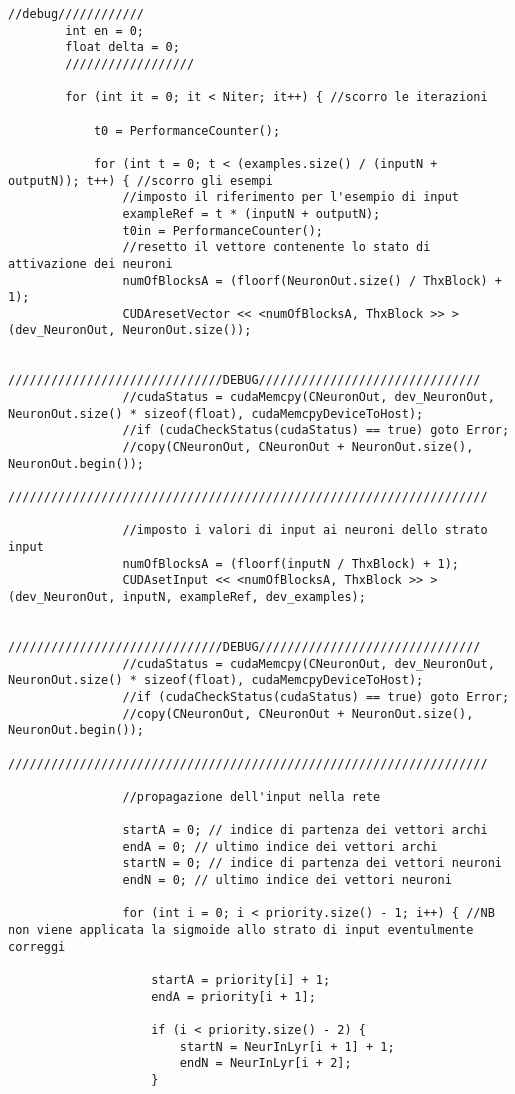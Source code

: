 \documentclass[10pt,a4paper]{article}
\begin{document}
\begin{lstlisting}[style=mycuda, caption=librerie usate, captionpos=b]
		//debug////////////
		int en = 0;
		float delta = 0;
		//////////////////

		for (int it = 0; it < Niter; it++) { //scorro le iterazioni

			t0 = PerformanceCounter();

			for (int t = 0; t < (examples.size() / (inputN + outputN)); t++) { //scorro gli esempi
				//imposto il riferimento per l'esempio di input
				exampleRef = t * (inputN + outputN);
				t0in = PerformanceCounter();
				//resetto il vettore contenente lo stato di attivazione dei neuroni
				numOfBlocksA = (floorf(NeuronOut.size() / ThxBlock) + 1);
				CUDAresetVector << <numOfBlocksA, ThxBlock >> > (dev_NeuronOut, NeuronOut.size());

				//////////////////////////////DEBUG///////////////////////////////
				//cudaStatus = cudaMemcpy(CNeuronOut, dev_NeuronOut, NeuronOut.size() * sizeof(float), cudaMemcpyDeviceToHost);
				//if (cudaCheckStatus(cudaStatus) == true) goto Error;
				//copy(CNeuronOut, CNeuronOut + NeuronOut.size(), NeuronOut.begin());
				///////////////////////////////////////////////////////////////////

				//imposto i valori di input ai neuroni dello strato input
				numOfBlocksA = (floorf(inputN / ThxBlock) + 1);
				CUDAsetInput << <numOfBlocksA, ThxBlock >> > (dev_NeuronOut, inputN, exampleRef, dev_examples);

				//////////////////////////////DEBUG///////////////////////////////
				//cudaStatus = cudaMemcpy(CNeuronOut, dev_NeuronOut, NeuronOut.size() * sizeof(float), cudaMemcpyDeviceToHost);
				//if (cudaCheckStatus(cudaStatus) == true) goto Error;
				//copy(CNeuronOut, CNeuronOut + NeuronOut.size(), NeuronOut.begin());
				///////////////////////////////////////////////////////////////////

				//propagazione dell'input nella rete

				startA = 0; // indice di partenza dei vettori archi
				endA = 0; // ultimo indice dei vettori archi
				startN = 0; // indice di partenza dei vettori neuroni
				endN = 0; // ultimo indice dei vettori neuroni

				for (int i = 0; i < priority.size() - 1; i++) { //NB non viene applicata la sigmoide allo strato di input eventulmente correggi

					startA = priority[i] + 1;
					endA = priority[i + 1];

					if (i < priority.size() - 2) {
						startN = NeurInLyr[i + 1] + 1;
						endN = NeurInLyr[i + 2];
					}


\end{lstlisting}
\end{document}
